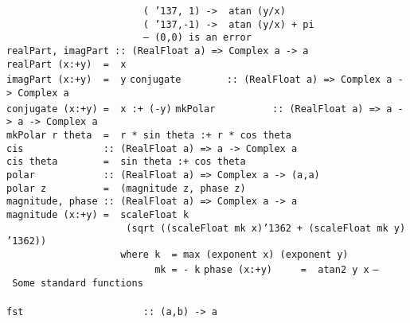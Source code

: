 \mbox{\tt \ \ \ \ \ \ \ \ \ \ \ \ \ \ \ \ \ \ \ \ \ \ \ \ (\ {\char'137},\ 1)\ ->\ \ atan\ (y/x)}\\
\mbox{\tt \ \ \ \ \ \ \ \ \ \ \ \ \ \ \ \ \ \ \ \ \ \ \ \ (\ {\char'137},-1)\ ->\ \ atan\ (y/x)\ +\ pi}\\
\mbox{\tt \ \ \ \ \ \ \ \ \ \ \ \ \ \ \ \ \ \ \ \ \ \ \ \ --\ (0,0)\ is\ an\ error}
%
\eprogB\noindent\bprogB
\mbox{\tt realPart,\ imagPart\ ::\ (RealFloat\ a)\ =>\ Complex\ a\ ->\ a}\\
\mbox{\tt realPart\ (x:+y)\ \ =\ \ x}\\
\mbox{\tt imagPart\ (x:+y)\ \ =\ \ y}
%
%
\eprogB\noindent\bprogB
\mbox{\tt conjugate\ \ \ \ \ \ \ \ ::\ (RealFloat\ a)\ =>\ Complex\ a\ ->\ Complex\ a}\\
\mbox{\tt conjugate\ (x:+y)\ =\ \ x\ :+\ (-y)}
%
\eprogB\noindent\bprogB
\mbox{\tt mkPolar\ \ \ \ \ \ \ \ \ \ ::\ (RealFloat\ a)\ =>\ a\ ->\ a\ ->\ Complex\ a}\\
\mbox{\tt mkPolar\ r\ theta\ \ =\ \ r\ *\ sin\ theta\ :+\ r\ *\ cos\ theta}
%
\eprogB\noindent\bprogB
\mbox{\tt cis\ \ \ \ \ \ \ \ \ \ \ \ \ \ ::\ (RealFloat\ a)\ =>\ a\ ->\ Complex\ a}\\
\mbox{\tt cis\ theta\ \ \ \ \ \ \ \ =\ \ sin\ theta\ :+\ cos\ theta}
%
\eprogB\noindent\bprogB
\mbox{\tt polar\ \ \ \ \ \ \ \ \ \ \ \ ::\ (RealFloat\ a)\ =>\ Complex\ a\ ->\ (a,a)}\\
\mbox{\tt polar\ z\ \ \ \ \ \ \ \ \ \ =\ \ (magnitude\ z,\ phase\ z)}
%
\eprogB\noindent\bprogB
\mbox{\tt magnitude,\ phase\ ::\ (RealFloat\ a)\ =>\ Complex\ a\ ->\ a}\\
\mbox{\tt magnitude\ (x:+y)\ =\ \ scaleFloat\ k}\\
\mbox{\tt \ \ \ \ \ \ \ \ \ \ \ \ \ \ \ \ \ \ \ \ \ (sqrt\ ((scaleFloat\ mk\ x){\char'136}2\ +\ (scaleFloat\ mk\ y){\char'136}2))}\\
\mbox{\tt \ \ \ \ \ \ \ \ \ \ \ \ \ \ \ \ \ \ \ \ where\ k\ \ =\ max\ (exponent\ x)\ (exponent\ y)}\\
\mbox{\tt \ \ \ \ \ \ \ \ \ \ \ \ \ \ \ \ \ \ \ \ \ \ \ \ \ \ mk\ =\ -\ k}
%
%
\eprogB\noindent\bprogB
\mbox{\tt phase\ (x:+y)\ \ \ \ \ =\ \ atan2\ y\ x}
\eprogB\noindent\bprogB
\mbox{\tt --\ Some\ standard\ functions}\\
\mbox{\tt }\\
\mbox{\tt fst\ \ \ \ \ \ \ \ \ \ \ \ \ \ \ \ \ \ \ \ \ ::\ (a,b)\ ->\ a}\\
